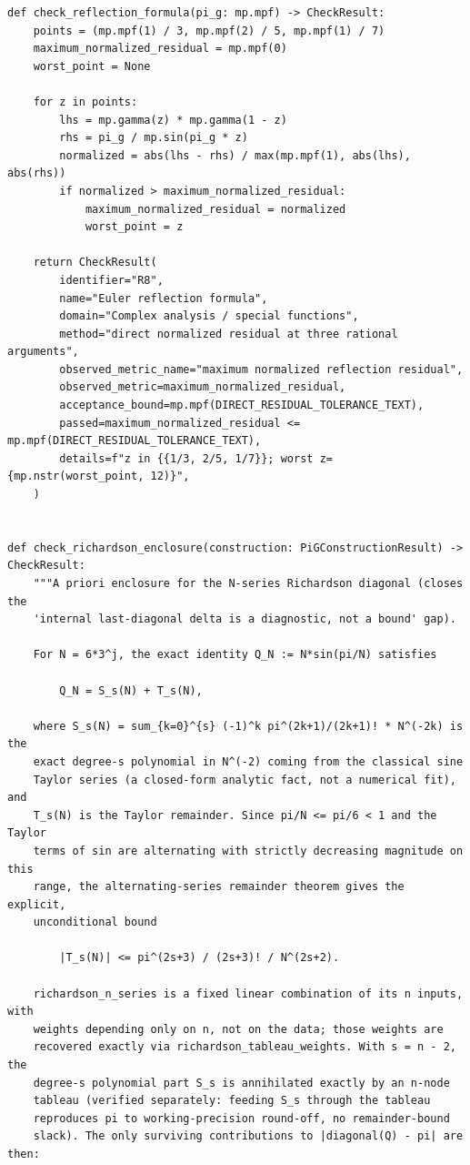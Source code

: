\documentclass[11pt]{article}
\begin{document}
\begin{lstlisting}[style=pythonstyle,caption={\texttt{verify\_pi\_g\_identities.py}}]
def check_reflection_formula(pi_g: mp.mpf) -> CheckResult:
    points = (mp.mpf(1) / 3, mp.mpf(2) / 5, mp.mpf(1) / 7)
    maximum_normalized_residual = mp.mpf(0)
    worst_point = None

    for z in points:
        lhs = mp.gamma(z) * mp.gamma(1 - z)
        rhs = pi_g / mp.sin(pi_g * z)
        normalized = abs(lhs - rhs) / max(mp.mpf(1), abs(lhs), abs(rhs))
        if normalized > maximum_normalized_residual:
            maximum_normalized_residual = normalized
            worst_point = z

    return CheckResult(
        identifier="R8",
        name="Euler reflection formula",
        domain="Complex analysis / special functions",
        method="direct normalized residual at three rational arguments",
        observed_metric_name="maximum normalized reflection residual",
        observed_metric=maximum_normalized_residual,
        acceptance_bound=mp.mpf(DIRECT_RESIDUAL_TOLERANCE_TEXT),
        passed=maximum_normalized_residual <= mp.mpf(DIRECT_RESIDUAL_TOLERANCE_TEXT),
        details=f"z in {{1/3, 2/5, 1/7}}; worst z={mp.nstr(worst_point, 12)}",
    )


def check_richardson_enclosure(construction: PiGConstructionResult) -> CheckResult:
    """A priori enclosure for the N-series Richardson diagonal (closes the
    'internal last-diagonal delta is a diagnostic, not a bound' gap).

    For N = 6*3^j, the exact identity Q_N := N*sin(pi/N) satisfies

        Q_N = S_s(N) + T_s(N),

    where S_s(N) = sum_{k=0}^{s} (-1)^k pi^(2k+1)/(2k+1)! * N^(-2k) is the
    exact degree-s polynomial in N^(-2) coming from the classical sine
    Taylor series (a closed-form analytic fact, not a numerical fit), and
    T_s(N) is the Taylor remainder. Since pi/N <= pi/6 < 1 and the Taylor
    terms of sin are alternating with strictly decreasing magnitude on this
    range, the alternating-series remainder theorem gives the explicit,
    unconditional bound

        |T_s(N)| <= pi^(2s+3) / (2s+3)! / N^(2s+2).

    richardson_n_series is a fixed linear combination of its n inputs, with
    weights depending only on n, not on the data; those weights are
    recovered exactly via richardson_tableau_weights. With s = n - 2, the
    degree-s polynomial part S_s is annihilated exactly by an n-node
    tableau (verified separately: feeding S_s through the tableau
    reproduces pi to working-precision round-off, no remainder-bound
    slack). The only surviving contributions to |diagonal(Q) - pi| are then:


\end{lstlisting}
\end{document}
